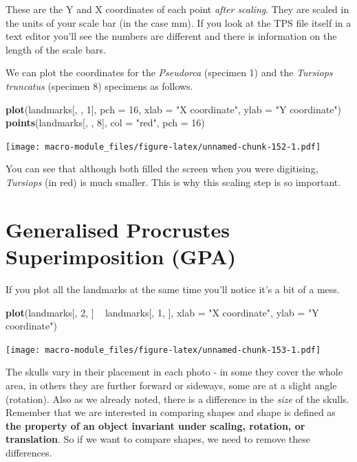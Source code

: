 \documentclass[]{book}
\newenvironment{Shaded}{\begin{snugshade}}{\end{snugshade}}
\newcommand{\KeywordTok}[1]{\textcolor[rgb]{0.13,0.29,0.53}{\textbf{{#1}}}}
\newcommand{\DataTypeTok}[1]{\textcolor[rgb]{0.13,0.29,0.53}{{#1}}}
\newcommand{\DecValTok}[1]{\textcolor[rgb]{0.00,0.00,0.81}{{#1}}}
\newcommand{\StringTok}[1]{\textcolor[rgb]{0.31,0.60,0.02}{{#1}}}
\newcommand{\NormalTok}[1]{{#1}}
\begin{document}
These are the Y and X coordinates of each point \emph{after scaling}.
They are scaled in the units of your scale bar (in the case mm). If you
look at the TPS file itself in a text editor you'll see the numbers are
different and there is information on the length of the scale bars.

We can plot the coordinates for the \emph{Pseudorca} (specimen 1) and
the \emph{Tursiops truncatus} (specimen 8) specimens as follows.

\begin{Shaded}
\begin{Highlighting}[]
\KeywordTok{plot}\NormalTok{(landmarks[, , }\DecValTok{1}\NormalTok{], }\DataTypeTok{pch =} \DecValTok{16}\NormalTok{, }\DataTypeTok{xlab =} \StringTok{"X coordinate"}\NormalTok{, }\DataTypeTok{ylab =} \StringTok{"Y coordinate"}\NormalTok{)}
\KeywordTok{points}\NormalTok{(landmarks[, , }\DecValTok{8}\NormalTok{], }\DataTypeTok{col =} \StringTok{"red"}\NormalTok{, }\DataTypeTok{pch =} \DecValTok{16}\NormalTok{)}
\end{Highlighting}
\end{Shaded}

\texttt{[image: macro-module\_files/figure-latex/unnamed-chunk-152-1.pdf]}

You can see that although both filled the screen when you were
digitising, \emph{Tursiops} (in red) is much smaller. This is why this
scaling step is so important.

\section{Generalised Procrustes Superimposition
(GPA)}\label{generalised-procrustes-superimposition-gpa}

If you plot all the landmarks at the same time you'll notice it's a bit
of a mess.

\begin{Shaded}
\begin{Highlighting}[]
\KeywordTok{plot}\NormalTok{(landmarks[, }\DecValTok{2}\NormalTok{, ] ~}\StringTok{ }\NormalTok{landmarks[, }\DecValTok{1}\NormalTok{, ], }\DataTypeTok{xlab =} \StringTok{"X coordinate"}\NormalTok{, }\DataTypeTok{ylab =} \StringTok{"Y coordinate"}\NormalTok{)}
\end{Highlighting}
\end{Shaded}

\texttt{[image: macro-module\_files/figure-latex/unnamed-chunk-153-1.pdf]}

The skulls vary in their placement in each photo - in some they cover
the whole area, in others they are further forward or sideways, some are
at a slight angle (rotation). Also as we already noted, there is a
difference in the \emph{size} of the skulls. Remember that we are
interested in comparing shapes and shape is defined as \textbf{the
property of an object invariant under scaling, rotation, or
translation}. So if we want to compare shapes, we need to remove these
differences.
\end{document}
